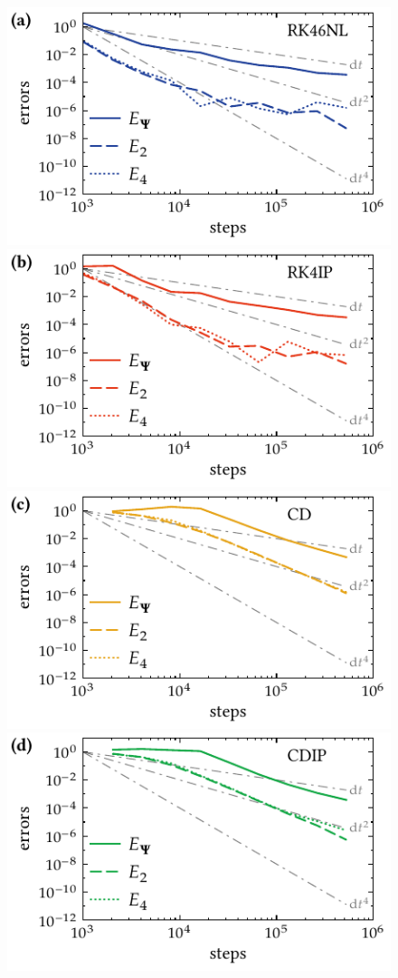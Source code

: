 \begin{figure}
    \includegraphics{figures_generated/test/convergence_wigner_RK46NL.pdf}%
    \includegraphics{figures_generated/test/convergence_wigner_RK4IP.pdf}\\%
    \includegraphics{figures_generated/test/convergence_wigner_CD.pdf}%
    \includegraphics{figures_generated/test/convergence_wigner_CDIP.pdf}%


\end{figure}
